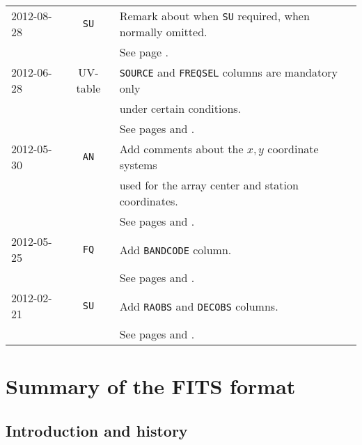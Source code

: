 \documentclass[twoside]{article}
\newcommand{\Me}[1]{\textcolor{mecol}{#1}}
\newcommand{\hblack}{\color{black}}
\begin{document}
\begin{center}
\begin{tabular}{lcl}
\noalign{\vspace{4pt}}
\Me{2012-08-28} & \Me{{\tt SU}} & \Me{Remark about when {\tt SU}
                       required, when normally omitted.} \\
           &          & \Me{See page \pageref{s:SU}.} \\
\noalign{\vspace{4pt}}
\Me{2012-06-28} & \Me{UV-table} & \Me{{\tt SOURCE} and {\tt FREQSEL}
                        columns are mandatory only} \\
           &          & \Me{under certain conditions.} \\
           &          & \Me{See pages \pageref{rev:UVt1} and
                        \pageref{rev:UVt2}.} \\
\noalign{\vspace{4pt}}
\Me{2012-05-30} & \Me{{\tt AN}} & \Me{Add comments about the $x,y$
                       coordinate systems} \\
           &          & \Me{used for the array center and station
                       coordinates.} \\
           &          & \Me{See pages \pageref{rev:AN1} and
                       \pageref{rev:AN2}.} \\
\noalign{\vspace{4pt}}
\Me{2012-05-25} & \Me{{\tt FQ}} & \Me{Add {\tt BANDCODE} column.} \\
           &          & \Me{See pages \pageref{ta:FQcols} and
                       \pageref{rev:FQ}.} \\
\noalign{\vspace{4pt}}
\Me{2012-02-21} & \Me{{\tt SU}} & \Me{Add {\tt RAOBS} and {\tt DECOBS}
                        columns.} \\
           &          & \Me{See pages \pageref{ta:SUcols} and
                       \pageref{rev:SU}.} \\
\end{tabular}
\end{center}
\hblack

\vfill\eject
\appendix

\section{Summary of the FITS format}
\label{Appen:FITS}

\subsection{Introduction and history}
\end{document}
